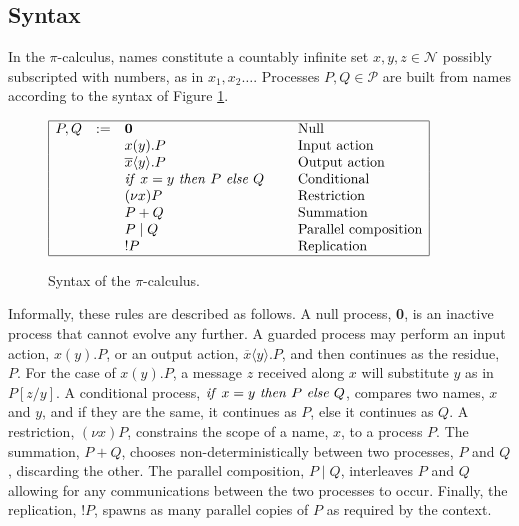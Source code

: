 \documentclass[10pt,a4paper,final,oneside,fleqn]{book}
\begin{document}
\subsection{Syntax\label{sect:syntaxpi}}
In the $\pi$-calculus, names constitute a countably infinite set $x,y,z\in\mathcal{N}$ possibly subscripted with numbers, as in $x_1,x_2\ldots$. Processes $P,Q\in\mathcal{P}$ are built from names according to the syntax of Figure \ref{syntaxpi}.
\begin{figure}[bht]
\begin{center}
$\begin{array}{|rrll|}\hline
P,Q&:=&{\textbf 0}&\hspace{5mm}\mbox{Null}\\
&&x(y).P&\hspace{5mm}\mbox{Input action}\\
&&\overline{x}\langle y\rangle.P&\hspace{5mm}\mbox{Output action}\\
&&\mbox{{\itshape if\/} }x=y\mbox{ {\itshape then\/} }P\mbox{ {\itshape else\/} }Q&\hspace{5mm}\mbox{Conditional}\\
&&(\nu x)P&\hspace{5mm}\mbox{Restriction}\\ &&P+Q&\hspace{5mm}\mbox{Summation}\\
&&P\mid Q&\hspace{5mm}\mbox{Parallel composition}\\
&&!P&\hspace{5mm}\mbox{Replication}\\
\hline
\end{array}$
\end{center}
\caption{Syntax of the $\pi$-calculus.\label{syntaxpi}}
\end{figure}

Informally, these rules are described as follows.  A null process, {\bf 0}, is an inactive process that cannot evolve any further.  A guarded process may perform an input action, $x(y).P$, or an output action, $\overline{x}\langle y\rangle.P$, and then continues as the residue, $P$.  For the case of $x(y).P$, a message $z$ received along $x$ will substitute $y$ as in $P[z/y]$.  A conditional process, $\mbox{{\itshape if\/} }x=y\mbox{ {\itshape then\/} }P\mbox{ {\itshape else\/} }Q$, compares two names, $x$ and $y$, and if they are the same, it continues as $P$, else it continues as $Q$. A restriction, $(\nu x)P$, constrains the scope of a name, $x$, to a process $P$.  The summation, $P+Q$, chooses non-deterministically between two processes, $P$ and $Q$, discarding the other.  The parallel composition, $P\mid Q$, interleaves $P$ and $Q$ allowing for any communications between the two processes to occur.  Finally, the replication, $!P$, spawns as many parallel copies of $P$ as required by the context.
\end{document}
